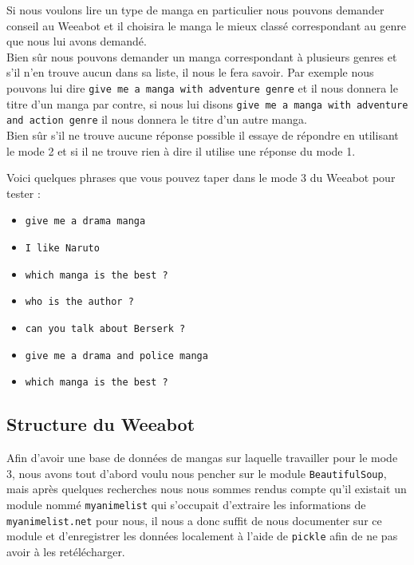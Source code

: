 \documentclass[paper=a4, fontsize=11pt]{article}
\begin{document}
\begin{itemize}
Si nous voulons lire un type de manga en particulier nous pouvons demander conseil au Weeabot et il choisira le manga le mieux classé correspondant au genre que nous lui avons demandé. \\
Bien sûr nous pouvons demander un manga correspondant à plusieurs genres et s'il n'en trouve aucun dans sa liste, il nous le fera savoir. Par exemple nous pouvons lui dire \texttt{give me a manga with adventure genre} et il nous donnera le titre d'un manga par contre, si nous lui disons \texttt{give me a manga with adventure and action genre} il nous donnera le titre d'un autre manga.\\
Bien sûr s'il ne trouve aucune réponse possible il essaye de répondre en utilisant le mode 2 et si il ne trouve rien à dire il utilise une réponse du mode 1.\\
\end{itemize}

Voici quelques phrases que vous pouvez taper dans le mode 3 du Weeabot pour tester :\\

\begin{itemize}
	\item \texttt{give me a drama manga}
	\item \texttt{I like Naruto}
	\item \texttt{which manga is the best ?}
	\item \texttt{who is the author ?}
	\item \texttt{can you talk about Berserk ?}
	\item \texttt{give me a drama and police manga}
	\item \texttt{which manga is the best ?}

\end{itemize}


\subsection{Structure du Weeabot}

Afin d'avoir une base de données de mangas sur laquelle travailler pour le mode 3, nous avons tout d'abord voulu nous pencher sur le module \texttt{BeautifulSoup}, mais après quelques recherches nous nous sommes rendus compte qu'il existait un module nommé \texttt{myanimelist} qui s'occupait d'extraire les informations de \texttt{myanimelist.net} pour nous, il nous a donc suffit de nous documenter sur ce module et d'enregistrer les données localement à l'aide de \texttt{pickle} afin de ne pas avoir à les retélécharger. \\
\end{document}
